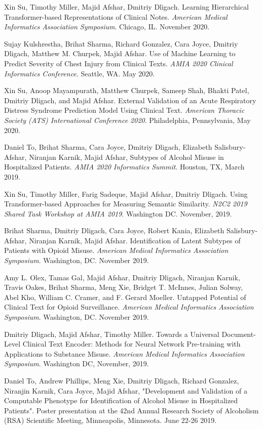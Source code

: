 \documentclass[letterpaper]{article}
\renewenvironment{itemize}{
  \begin{list}{}{
    \setlength{\leftmargin}{1.5em}
  }
}{
  \end{list}
}
\begin{document}
\begin{itemize}
\item Xin Su, Timothy Miller, Majid Afshar, Dmitriy Dligach. Learning Hierarchical Transformer-based Representations of Clinical Notes. \emph{American Medical Informatics Association Symposium}. Chicago, IL. November 2020.
\item Sujay Kulshrestha, Brihat Sharma, Richard Gonzalez, Cara Joyce, Dmitriy Dligach, Matthew M. Churpek, Majid Afshar. Use of Machine Learning to Predict Severity of Chest Injury from Clinical Texts. \emph{AMIA 2020 Clinical Informatics Conference}. Seattle, WA. May 2020.
\item Xin Su, Anoop Mayampurath, Matthew Churpek, Sameep Shah, Bhakti Patel, Dmitriy Dligach, and Majid Afshar. External Validation of an Acute Respiratory Distress Syndrome Prediction Model Using Clinical Text. \emph{American Thoracic Society (ATS) International Conference 2020}. Philadelphia, Pennsylvania, May 2020.
\item Daniel To, Brihat Sharma, Cara Joyce, Dmitriy Dligach, Elizabeth Salisbury-Afshar, Niranjan Karnik, Majid Afshar, Subtypes of Alcohol Misuse in Hospitalized Patients. \emph{AMIA 2020 Informatics Summit}. Houston, TX, March 2019.
\item Xin Su, Timothy Miller, Farig Sadeque, Majid Afshar, Dmitriy Dligach. Using Transformer-based Approaches for Measuring Semantic Similarity. \emph{N2C2 2019 Shared Task Workshop at AMIA 2019}. Washington DC. November, 2019.
\item Brihat Sharma, Dmitriy Dligach, Cara Joyce, Robert Kania, Elizabeth Salisbury-Afshar, Niranjan Karnik, Majid Afshar. Identification of Latent Subtypes of Patients with Opioid Misuse. \emph{American Medical Informatics Association Symposium}. Washington, DC. November 2019.
\item Amy L. Olex, Tamas Gal, Majid Afshar, Dmitriy Dligach, Niranjan Karnik, Travis Oakes, Brihat Sharma, Meng Xie, Bridget T. McInnes, Julian Solway, Abel Kho, William C. Cramer, and F. Gerard Moeller. Untapped Potential of Clinical Text for Opioid Surveillance. \emph{American Medical Informatics Association Symposium}. Washington, DC. November 2019.
\item Dmitriy Dligach, Majid Afshar, Timothy Miller. Towards a Universal Document-Level Clinical Text Encoder: Methods for Neural Network Pre-training with Applications to Substance Misuse. \emph{American Medical Informatics Association Symposium}. Washington DC, November, 2019.
\item Daniel To, Andrew Phillips, Meng Xie, Dmitriy Dligach, Richard Gonzalez, Niranjin Karnik, Cara Joyce, Majid Afshar, "Development and Validation of a Computable Phenotype for Identification of Alcohol Misuse in Hospitalized Patients". Poster presentation at the 42nd Annual Research Society of Alcoholism (RSA) Scientific Meeting, Minneapolis, Minnesota. June 22-26 2019.

\end{itemize}
\end{document}
